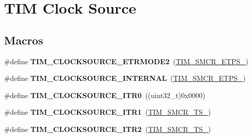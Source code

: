 \hypertarget{group___t_i_m___clock___source}{\section{T\-I\-M Clock Source}
\label{group___t_i_m___clock___source}
}
\subsection*{Macros}
\begin{DoxyCompactItemize}
\item 
\hypertarget{group___t_i_m___clock___source_gab133f0839cf6a4e858457d48f057eea8}{\#define {\bfseries T\-I\-M\-\_\-\-C\-L\-O\-C\-K\-S\-O\-U\-R\-C\-E\-\_\-\-E\-T\-R\-M\-O\-D\-E2}~(\hyperlink{group___peripheral___registers___bits___definition_gabf12f04862dbc92ca238d1518b27b16b}{T\-I\-M\-\_\-\-S\-M\-C\-R\-\_\-\-E\-T\-P\-S\-\_})}\label{group___t_i_m___clock___source_gab133f0839cf6a4e858457d48f057eea8}

\item 
\hypertarget{group___t_i_m___clock___source_ga9b398a201d8b6a4f200ebde86b1d8f3a}{\#define {\bfseries T\-I\-M\-\_\-\-C\-L\-O\-C\-K\-S\-O\-U\-R\-C\-E\-\_\-\-I\-N\-T\-E\-R\-N\-A\-L}~(\hyperlink{group___peripheral___registers___bits___definition_ga00b43cd09557a69ed10471ed76b228d8}{T\-I\-M\-\_\-\-S\-M\-C\-R\-\_\-\-E\-T\-P\-S\-\_})}\label{group___t_i_m___clock___source_ga9b398a201d8b6a4f200ebde86b1d8f3a}

\item 
\hypertarget{group___t_i_m___clock___source_ga3310aa84f2f322eb77538997c070e56a}{\#define {\bfseries T\-I\-M\-\_\-\-C\-L\-O\-C\-K\-S\-O\-U\-R\-C\-E\-\_\-\-I\-T\-R0}~((uint32\-\_\-t)0x0000)}\label{group___t_i_m___clock___source_ga3310aa84f2f322eb77538997c070e56a}

\item 
\hypertarget{group___t_i_m___clock___source_gae2da814f8d86491e7c344bb8d0f62b96}{\#define {\bfseries T\-I\-M\-\_\-\-C\-L\-O\-C\-K\-S\-O\-U\-R\-C\-E\-\_\-\-I\-T\-R1}~(\hyperlink{group___peripheral___registers___bits___definition_ga8d1f040f9259acb3c2fba7b0c7eb3d96}{T\-I\-M\-\_\-\-S\-M\-C\-R\-\_\-\-T\-S\-\_})}\label{group___t_i_m___clock___source_gae2da814f8d86491e7c344bb8d0f62b96}

\item 
\hypertarget{group___t_i_m___clock___source_gafb779719a41769b14303da4977f6a5f1}{\#define {\bfseries T\-I\-M\-\_\-\-C\-L\-O\-C\-K\-S\-O\-U\-R\-C\-E\-\_\-\-I\-T\-R2}~(\hyperlink{group___peripheral___registers___bits___definition_gacb82212fcc89166a43ff97542da9182d}{T\-I\-M\-\_\-\-S\-M\-C\-R\-\_\-\-T\-S\-\_})}\label{group___t_i_m___clock___source_gafb779719a41769b14303da4977f6a5f1}


\end{DoxyCompactItemize}
